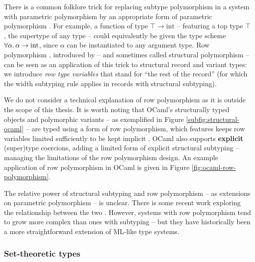 There is a common folklore trick for replacing subtype polymorphism in a system with parametric polymorphism by an appropriate form of parametric polymorphism \cite{structural-subtyping-as-parameric-polymorphism}. For example, a function of type $\top \to \mathrm{int}$ -- featuring a top type $\top$, the supertype of any type -- could equivalently be given the type scheme $\forall \alpha \ldotp \alpha \to \mathrm{int}$, since $\alpha$ can be instantiated to any argument type.
Row polymorphism \cite{remy-records}, introduced by \textcite{wand-rows} -- and sometimes called structural polymorphism \cite{simple-structural-polymorphism} -- can be seen as an application of this trick to structural record and variant types: we introduce \emph{row type variables} that stand for \enquote{the rest of the record} (for which the width subtyping rule applies in records with structural subtyping).

We do not consider a technical explanation of row polymorphism as it is outside the scope of this thesis. It is worth noting that OCaml's structurally typed objects \cite{objective-ml} and polymorphic variants \cite{polymorphic-variants} -- as exemplified in Figure \ref{subfig:structural-ocaml} -- are typed using a form of row polymorphism, which features keeps row variables limited sufficiently to be kept implicit \cite{objective-ml}. OCaml also supports \textbf{explicit} (super)type coercions, adding a limited form of explicit structural subtyping -- managing the limitations of the row polymorphism design. 
An example application of row polymorphism in OCaml is given in Figure \ref{fig:ocaml-row-polymorphism}.

The relative power of structural subtyping and row polymorphism -- as extensions on parametric polymorphism -- is unclear.
There is some recent work exploring the relationship between the two \cite{disjoint-polymorphism, structural-subtyping-as-parameric-polymorphism}. However, systems with row polymorphism tend to grow more complex than ones with subtyping -- but they have historically been a more straightforward extension of ML-like type systems.

\subsubsection{Set-theoretic types}

